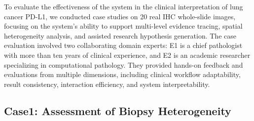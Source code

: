 \documentclass[journal]{vgtc}                     %
\begin{document}
To evaluate the effectiveness of the system in the clinical interpretation of lung cancer PD-L1, we conducted case studies on 20 real IHC whole-slide images, focusing on the system's ability to support multi-level evidence tracing, spatial heterogeneity analysis, and assisted research hypothesis generation. The case evaluation involved two collaborating domain experts: E1 is a chief pathologist with more than ten years of clinical experience, and E2 is an academic researcher specializing in computational pathology. They provided hands-on feedback and evaluations from multiple dimensions, including clinical workflow adaptability, result consistency, interaction efficiency, and system interpretability.



\subsection{Case1: Assessment of Biopsy Heterogeneity}
\end{document}
